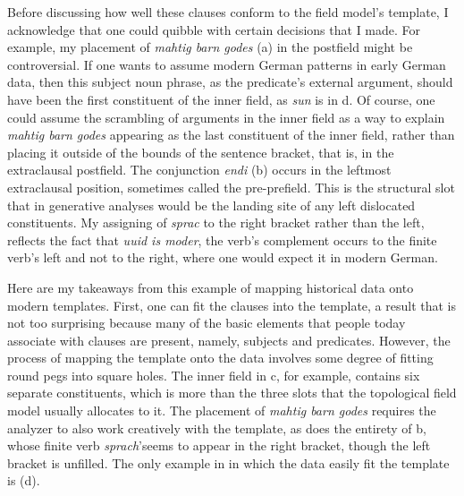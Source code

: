 \noindent Before discussing how well these clauses conform to the field model’s template, I acknowledge that one could quibble with certain decisions that I made. For example, my placement of \textit{mahtig barn godes} (a) in the postfield might be controversial. If one wants to assume modern German patterns in early German data, then this subject noun phrase, as the predicate’s external argument, should have been the first constituent of the inner field, as \textit{sun} is in d. Of course, one could assume the scrambling of arguments in the inner field as a way to explain \textit{mahtig barn godes} appearing as the last constituent of the inner field, rather than placing it outside of the bounds of the sentence bracket, that is, in the extraclausal postfield. The conjunction \textit{endi} (b) occurs in the leftmost extraclausal position, sometimes called the pre-prefield. This is the structural slot that in generative analyses would be the landing site of any left dislocated constituents. My assigning of \textit{sprac} to the right bracket rather than the left, reflects the fact that \textit{uuid is moder}, the verb’s complement occurs to the finite verb’s left and not to the right, where one would expect it in modern German.

Here are my takeaways from this example of mapping historical data onto modern templates. First, one can fit the clauses into the template, a result that is not too surprising because many of the basic elements that people today associate with clauses are present, namely, subjects and predicates. However, the process of mapping the template onto the data involves some degree of fitting round pegs into square holes. The inner field in c, for example, contains six separate constituents, which is more than the three slots that the topological field model usually allocates to it. The placement of \textit{mahtig barn godes} requires the analyzer to also work creatively with the template, as does the entirety of b, whose finite verb \textit{sprach}’seems to appear in the right bracket, though the left bracket is unfilled. The only example in  in which the data easily fit the template is (d).

